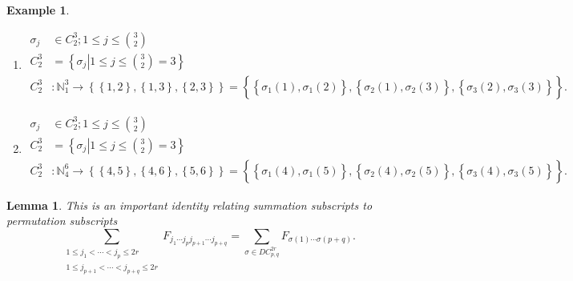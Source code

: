 \documentclass[aps,preprint]{revtex4}%
\newtheorem{example}[theorem]{Example}
\newtheorem{lemma}[theorem]{Lemma}
\begin{document}
\begin{example}
\begin{enumerate}
\item
\begin{align}
\sigma_{j}  &  \in C_{2}^{3};1\leq j\leq\binom{3}{2}\\
C_{2}^{3}  &  =\left\{  \left.  \overset{}{\sigma_{j}}\right\vert 1\leq
j\leq\binom{3}{2}=3\right\} \\
C_{2}^{3}  &  :\mathbb{N}_{1}^{3}\rightarrow\left\{  \left\{  1,2\right\}
,\left\{  1,3\right\}  ,\left\{  2,3\right\}  \right\}  =\left\{
\overset{}{\left\{  \overset{}{\sigma_{1}\left(  1\right)  ,\sigma_{1}\left(
2\right)  }\right\}  ,\left\{  \overset{}{\sigma_{2}\left(  1\right)
,\sigma_{2}\left(  3\right)  }\right\}  ,\left\{  \overset{}{\sigma_{3}\left(
2\right)  ,\sigma_{3}\left(  3\right)  }\right\}  }\right\}  .
\end{align}


\item
\begin{align}
\sigma_{j}  &  \in C_{2}^{3};1\leq j\leq\binom{3}{2}\\
C_{2}^{3}  &  =\left\{  \left.  \overset{}{\sigma_{j}}\right\vert 1\leq
j\leq\binom{3}{2}=3\right\} \\
C_{2}^{3}  &  :\mathbb{N}_{4}^{6}\rightarrow\left\{  \left\{  4,5\right\}
,\left\{  4,6\right\}  ,\left\{  5,6\right\}  \right\}  =\left\{
\overset{}{\left\{  \overset{}{\sigma_{1}\left(  4\right)  ,\sigma_{1}\left(
5\right)  }\right\}  ,\left\{  \overset{}{\sigma_{2}\left(  4\right)
,\sigma_{2}\left(  5\right)  }\right\}  ,\left\{  \overset{}{\sigma_{3}\left(
4\right)  ,\sigma_{3}\left(  5\right)  }\right\}  }\right\}  .
\end{align}

\end{enumerate}
\end{example}

\begin{lemma}
\emph{This is an important identity relating summation subscripts to
permutation subscripts \label{summation subscripts to permutation subscripts}
}%
\begin{equation}
\sum_{\substack{1\leq j_{1}<\cdots<j_{p}\leq2r\\1\leq j_{p+1}<\cdots
<j_{p+q}\leq2r}}F_{j_{1}\cdots j_{p}j_{p+1}\cdots j_{p+q}}=\sum_{\sigma\in
DC_{p,q}^{2r}}F_{\sigma\left(  1\right)  \cdots\sigma\left(  p+q\right)  }.
\end{equation}

\end{lemma}
\end{document}
